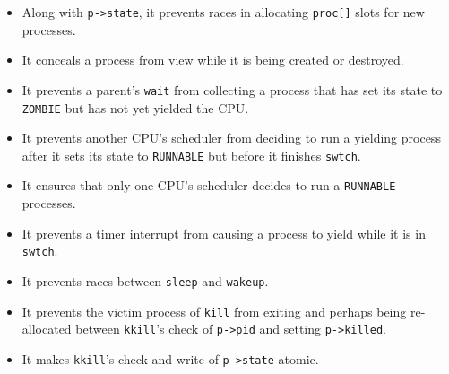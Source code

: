 \begin{itemize}

\item Along with \lstinline{p->state}, it prevents races in allocating
  \lstinline{proc[]} slots for new processes.

\item It conceals a process from view while it is being created
or destroyed.

\item It prevents a parent's \lstinline{wait} from collecting a
process that has set its state to \lstinline{ZOMBIE} but has
not yet yielded the CPU.

\item It prevents another CPU's scheduler from deciding to run
a yielding process after it sets its state to \lstinline{RUNNABLE} but
before it finishes \lstinline{swtch}.

\item It ensures that only one CPU's scheduler decides to run a
  \lstinline{RUNNABLE} processes.

\item It prevents a timer interrupt from causing a process to
yield while it is in \lstinline{swtch}.

\item It prevents races between \lstinline{sleep} and \lstinline{wakeup}.

\item It prevents the victim process of \lstinline{kill} from exiting
and perhaps being re-allocated between \lstinline{kkill}'s check of 
\lstinline{p->pid} and setting \lstinline{p->killed}.

\item It makes \lstinline{kkill}'s check and write of \lstinline{p->state}
atomic.

\end{itemize}



